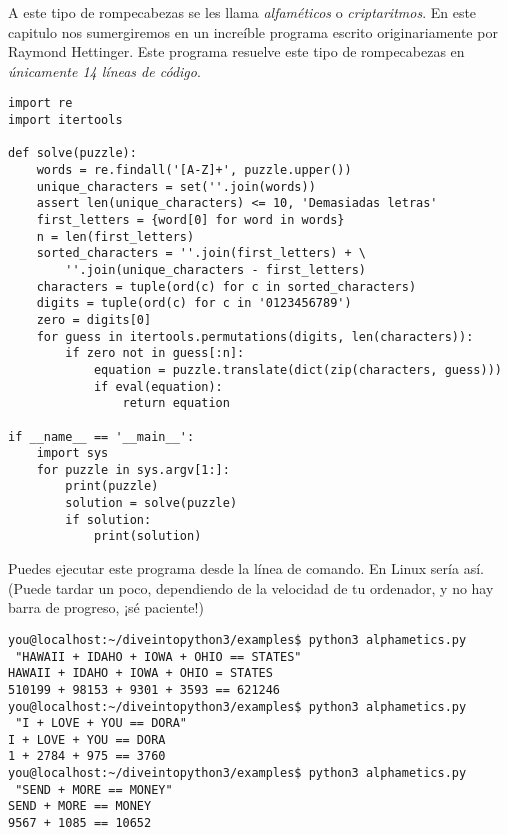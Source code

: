 A este tipo de rompecabezas se les llama \emph{alfaméticos} o \emph{criptaritmos}. En este capitulo nos sumergiremos en un increíble programa escrito originariamente por Raymond Hettinger. Este programa resuelve este tipo de rompecabezas en \emph{únicamente 14 líneas de código}.

\noindent\begin{minipage}{\textwidth}
\begin{lstlisting}[mathescape=False]
import re
import itertools

def solve(puzzle):
    words = re.findall('[A-Z]+', puzzle.upper())
    unique_characters = set(''.join(words))
    assert len(unique_characters) <= 10, 'Demasiadas letras'
    first_letters = {word[0] for word in words}
    n = len(first_letters)
    sorted_characters = ''.join(first_letters) + \
        ''.join(unique_characters - first_letters)
    characters = tuple(ord(c) for c in sorted_characters)
    digits = tuple(ord(c) for c in '0123456789')
    zero = digits[0]
    for guess in itertools.permutations(digits, len(characters)):
        if zero not in guess[:n]:
            equation = puzzle.translate(dict(zip(characters, guess)))
            if eval(equation):
                return equation

if __name__ == '__main__':
    import sys
    for puzzle in sys.argv[1:]:
        print(puzzle)
        solution = solve(puzzle)
        if solution:
            print(solution)
\end{lstlisting}
\end{minipage}

Puedes ejecutar este programa desde la línea de comando. En Linux sería así. (Puede tardar un poco, dependiendo de la velocidad de tu ordenador, y no hay barra de progreso, ¡sé paciente!)

\noindent\begin{minipage}{\textwidth}
\begin{lstlisting}[mathescape=False]
you@localhost:~/diveintopython3/examples$ python3 alphametics.py 
 "HAWAII + IDAHO + IOWA + OHIO == STATES"
HAWAII + IDAHO + IOWA + OHIO = STATES
510199 + 98153 + 9301 + 3593 == 621246
you@localhost:~/diveintopython3/examples$ python3 alphametics.py
 "I + LOVE + YOU == DORA"
I + LOVE + YOU == DORA
1 + 2784 + 975 == 3760
you@localhost:~/diveintopython3/examples$ python3 alphametics.py
 "SEND + MORE == MONEY"
SEND + MORE == MONEY
9567 + 1085 == 10652
\end{lstlisting}
\end{minipage}

